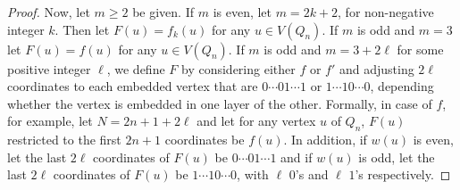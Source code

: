 \documentclass[11pt, a4paper]{article}
\begin{document}
\begin{proof}
Now, let $m\geq 2$ be given. If $m$ is even, let $m=2k+2$, for non-negative integer $k$. Then let $F(u) = f_k(u)$ for any $u\in V(Q_n)$. 
If $m$ is odd and $m=3$ let $F(u) = f(u)$ for any $u\in V(Q_n)$. 
If $m$ is odd and $m= 3 +2\ell$ for some positive integer $\ell$, we define $F$ by considering either $f$ or $f'$ and adjusting $2\ell$ coordinates to each embedded vertex 
that are $0\cdots 0 1 \cdots 1$ or $ 1\cdots 1 0\cdots 0$, depending whether the vertex is embedded in one layer of the other. 
Formally, in case of $f$, for example, let  $N= 2n+1+ 2\ell$ and let for any vertex $u$ of $Q_n$, $F(u)$ restricted to the first $2n+1$ coordinates be $f(u)$. 
In addition, if $w(u)$ is even, let the last $2\ell$ coordinates of $F(u)$ be $0\cdots 0 1 \cdots 1$ and 
if $w(u)$ is odd, let the last $2\ell$ coordinates of $F(u)$ be $1\cdots 1 0 \cdots 0$,  with $\ell$ $0$'s and $\ell$ $1$'s respectively. 
\end{proof}

		
\end{document}
